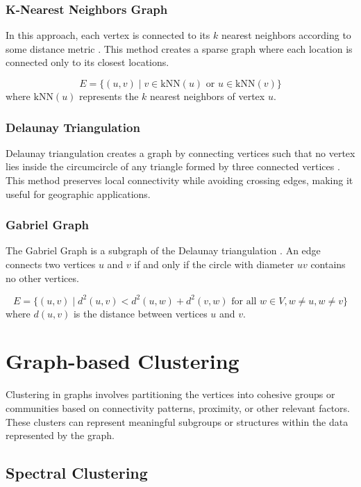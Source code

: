 \subsubsection{K-Nearest Neighbors Graph}
In this approach, each vertex is connected to its $k$ nearest neighbors according to some distance metric . This method creates a sparse graph where each location is connected only to its closest locations.

\begin{equation}
    E = \{(u, v) \mid v \in \text{kNN}(u) \text{ or } u \in \text{kNN}(v)\}
\end{equation}
where $\text{kNN}(u)$ represents the $k$ nearest neighbors of vertex $u$.

\subsubsection{Delaunay Triangulation}
Delaunay triangulation creates a graph by connecting vertices such that no vertex lies inside the circumcircle of any triangle formed by three connected vertices . This method preserves local connectivity while avoiding crossing edges, making it useful for geographic applications.

\subsubsection{Gabriel Graph}
The Gabriel Graph is a subgraph of the Delaunay triangulation . An edge connects two vertices $u$ and $v$ if and only if the circle with diameter $uv$ contains no other vertices.

\begin{equation}
    E = \{(u, v) \mid d^2(u, v) < d^2(u, w) + d^2(v, w) \text{ for all } w \in V, w \neq u, w \neq v\}
\end{equation}
where $d(u, v)$ is the distance between vertices $u$ and $v$.

\section{Graph-based Clustering}
\label{se:GraphBasedClusterings}

Clustering in graphs involves partitioning the vertices into cohesive groups or communities based on connectivity patterns, proximity, or other relevant factors. These clusters can represent meaningful subgroups or structures within the data represented by the graph.

\subsection{Spectral Clustering}
\label{subsec:SpectralClustering}

